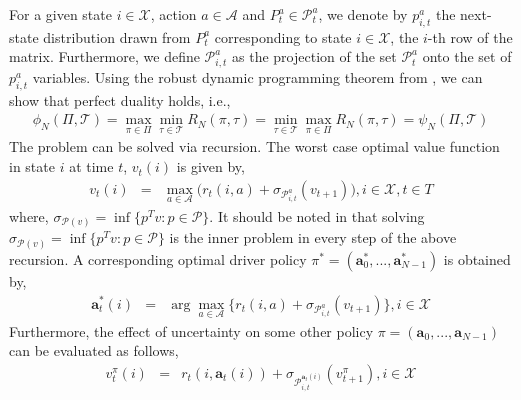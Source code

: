 For a given state $i \in \mathcal{X}$, action $a \in \mathcal{A}$ and $P^{a}_t \in \mathcal{P}^{a}_t$, we denote by $p^{a}_{i,t}$ the next-state distribution drawn from $P^{a}_t$ corresponding to state $i \in \mathcal{X}$, the $i$-th row of the matrix. Furthermore, we define $\mathcal{P}^{a}_{i,t}$ as the projection of the set $\mathcal{P}^{a}_{t}$ onto the set of $p^{a}_{i,t}$ variables. Using the robust dynamic programming theorem from \cite{nilim2003robustness}, we can show that perfect duality holds, i.e.,
\begin{eqnarray}
\phi_N(\Pi, \mathcal{T}) = \max_{\pi \in \Pi} \min_{\tau \in \mathcal{T}} R_N(\pi, \tau) = \min_{\tau \in \mathcal{T}} \max_{\pi \in \Pi} R_N(\pi, \tau) = \psi_N(\Pi, \mathcal{T})
\end{eqnarray}
The problem can be solved via recursion. The worst case optimal value function in state $i$ at time $t$, $v_t(i)$ is given by, 
\begin{eqnarray}
v_t(i) &=& \max_{a \in \mathcal{A}} \bigg(r_t(i,a) + \sigma_{\mathcal{P}^{a}_{i,t}}(v_{t+1})\bigg), i \in \mathcal{X}, t \in T
\end{eqnarray}
where, $\sigma_{\mathcal{P}(v)} = \inf\{p^Tv : p \in \mathcal{P}\}$. It should be noted in that solving $\sigma_{\mathcal{P}(v)} = \inf\{p^Tv : p \in \mathcal{P}\}$ is the inner problem in every step of the above recursion. A corresponding optimal driver policy $\pi^* = (\textbf{a}^*_0, ..., \textbf{a}^*_{N-1})$ is obtained by,
\begin{eqnarray}
\textbf{a}^*_t(i) &=& \arg \max_{a \in \mathcal{A}} \bigg\{r_t(i,a) + \sigma_{\mathcal{P}^{a}_{i,t}}(v_{t+1})\bigg\}, i \in \mathcal{X}
\end{eqnarray}
Furthermore, the effect of uncertainty on some other policy $\pi = (\textbf{a}_0, ..., \textbf{a}_{N-1})$ can be evaluated as follows,
\begin{eqnarray}
v^{\pi}_t(i) &=& r_t(i,\textbf{a}_t(i)) + \sigma_{\mathcal{P}^{\textbf{a}_t(i)}_{i,t}}(v^{\pi}_{t+1}), i \in \mathcal{X}
\end{eqnarray}

